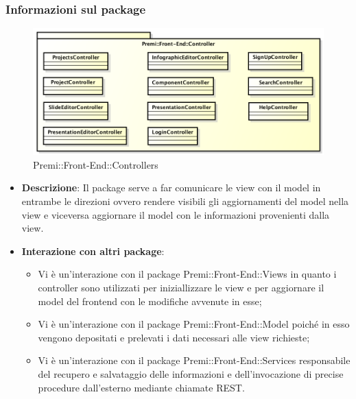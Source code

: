 \subsubsection{Informazioni sul package}
\begin{figure}[h]
	\centering
	\includegraphics[width=1.0\linewidth]{img/front-end_controller}
	\caption[Premi::Front-End::Controllers]{Premi::Front-End::Controllers}
\end{figure}
\begin{itemize}
	\item \textbf{Descrizione}: Il package serve a far comunicare le view con il model in entrambe le direzioni ovvero rendere visibili gli aggiornamenti del model nella view e viceversa aggiornare il model con le informazioni provenienti dalla view.
	\item \textbf{Interazione con altri package}:
	\begin{itemize}
		\item Vi è un'interazione con il package Premi::Front-End::Views in quanto i controller sono utilizzati per iniziallizzare le view e per aggiornare il model del frontend con le modifiche avvenute in esse;
		\item Vi è un'interazione con il package Premi::Front-End::Model poiché in esso vengono depositati e prelevati i dati necessari alle view richieste;
		\item Vi è un'interazione con il package Premi::Front-End::Services responsabile del recupero e salvataggio delle informazioni e dell'invocazione di precise procedure dall'esterno mediante chiamate REST.
	\end{itemize}

\end{itemize}

